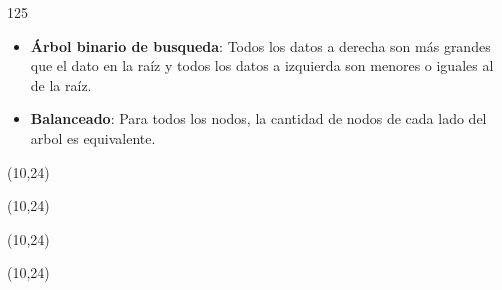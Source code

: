 \documentclass[aspectratio=169]{beamer}
\begin{document}
\begin{frame}
\begin{textblock}{125}
\begin{itemize}
     \item<2-3>[-] \textbf{Árbol binario de busqueda}: Todos los datos a derecha son más grandes que el dato en la raíz y todos los datos a izquierda son menores o iguales al de la raíz.
     \item<3-3>[-] \textbf{Balanceado}: Para todos los nodos, la cantidad de nodos de cada lado del arbol es equivalente.
    \end{itemize}
    \end{textblock}
    \begin{textblock}{50}(10,24)  \end{textblock}
    \begin{textblock}{50}(10,24)  \end{textblock}
    \begin{textblock}{50}(10,24)  \end{textblock}
    \begin{textblock}{50}(10,24)  \end{textblock}
\end{frame}
\end{document}
